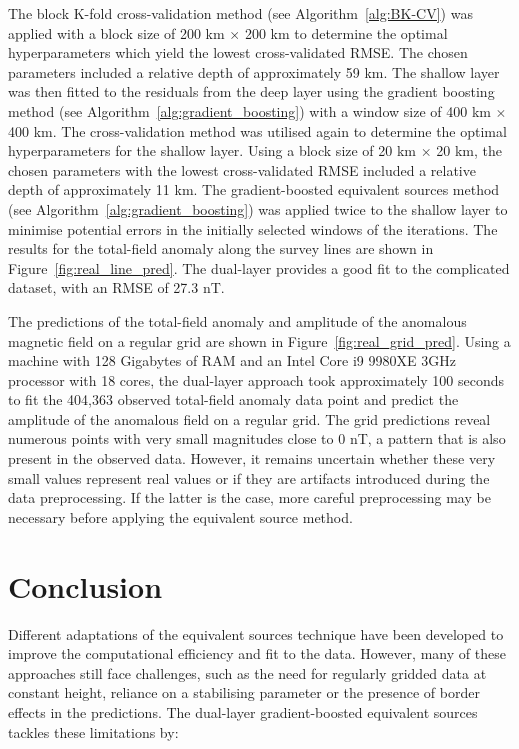 The block K-fold cross-validation method (see Algorithm~\ref{alg:BK-CV}) was applied with a block size of 200 km $\times$ 200 km to determine the optimal hyperparameters which yield the lowest cross-validated RMSE. The chosen parameters included a relative depth of approximately 59 km. The shallow layer was then fitted to the residuals from the deep layer using the gradient boosting method (see Algorithm~\ref{alg:gradient_boosting}) with a window size of 400 km $\times$ 400 km. The cross-validation method was utilised again to determine the optimal hyperparameters for the shallow layer. Using a block size of 20 km $\times$ 20 km, the chosen parameters with the lowest cross-validated RMSE included a relative depth of approximately 11 km. The gradient-boosted equivalent sources method (see Algorithm~\ref{alg:gradient_boosting}) was applied twice to the shallow layer to minimise potential errors in the initially selected windows of the iterations. The results for the total-field anomaly along the survey lines are shown in Figure~\ref{fig:real_line_pred}. The dual-layer provides a good fit to the complicated dataset, with an RMSE of 27.3 nT.

The predictions of the total-field anomaly and amplitude of the anomalous magnetic field on a regular grid are shown in Figure~\ref{fig:real_grid_pred}. Using a machine with 128 Gigabytes of RAM and an Intel Core i9 9980XE 3GHz processor with 18 cores, the dual-layer approach took approximately 100 seconds to fit the 404,363 observed total-field anomaly data point and predict the amplitude of the anomalous field on a regular grid. The grid predictions reveal numerous points with very small magnitudes close to 0 nT, a pattern that is also present in the observed data. However, it remains uncertain whether these very small values represent real values or if they are artifacts introduced during the data preprocessing. If the latter is the case, more careful preprocessing may be necessary before applying the equivalent source method.



\section{Conclusion}

Different adaptations of the equivalent sources technique have been developed to improve the computational efficiency and fit to the data. However, many of these approaches still face challenges, such as the need for regularly gridded data at constant height, reliance on a stabilising parameter or the presence of border effects in the predictions. The dual-layer gradient-boosted equivalent sources tackles these limitations by:

